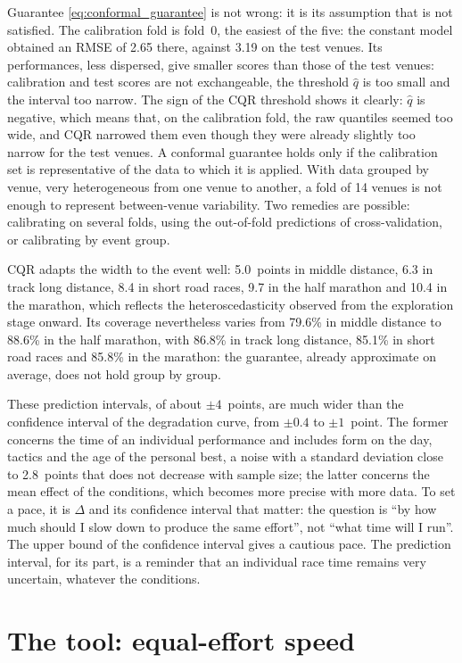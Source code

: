 \documentclass[11pt,a4paper]{article}
\begin{document}
Guarantee \eqref{eq:conformal_guarantee} is not wrong: it is its assumption that is not satisfied. The calibration fold
is fold~0, the easiest of the five: the constant model obtained an RMSE of 2.65 there, against 3.19 on the test venues.
Its performances, less dispersed, give smaller scores than those of the test venues: calibration and test scores are
not exchangeable, the threshold $\hat q$ is too small and the interval too narrow. The sign of the CQR threshold shows
it clearly: $\hat q$ is negative, which means that, on the calibration fold, the raw quantiles seemed too wide, and CQR
narrowed them even though they were already slightly too narrow for the test venues. A conformal guarantee holds only
if the calibration set is representative of the data to which it is applied. With data grouped by venue, very
heterogeneous from one venue to another, a fold of 14 venues is not enough to represent between-venue variability. Two
remedies are possible: calibrating on several folds, using the out-of-fold predictions of cross-validation, or
calibrating by event group.

CQR adapts the width to the event well: 5.0~points in middle distance, 6.3 in track long distance, 8.4 in short road
races, 9.7 in the half marathon and 10.4 in the marathon, which reflects the heteroscedasticity observed from the
exploration stage onward. Its coverage nevertheless varies from 79.6\% in middle distance to 88.6\% in the half
marathon, with 86.8\% in track long distance, 85.1\% in short road races and 85.8\% in the marathon: the guarantee,
already approximate on average, does not hold group by group.

These prediction intervals, of about $\pm 4$~points, are much wider than the confidence interval of the degradation
curve, from $\pm 0.4$ to $\pm 1$~point. The former concerns the time of an individual performance and includes form on
the day, tactics and the age of the personal best, a noise with a standard deviation close to 2.8~points that does not
decrease with sample size; the latter concerns the mean effect of the conditions, which becomes more precise with more
data. To set a pace, it is $\Delta$ and its confidence interval that matter: the question is ``by how much should I
slow down to produce the same effort'', not ``what time will I run''. The upper bound of the confidence interval gives
a cautious pace. The prediction interval, for its part, is a reminder that an individual race time remains very
uncertain, whatever the conditions.

\section{The tool: equal-effort speed}\label{sec:tool}
\end{document}
